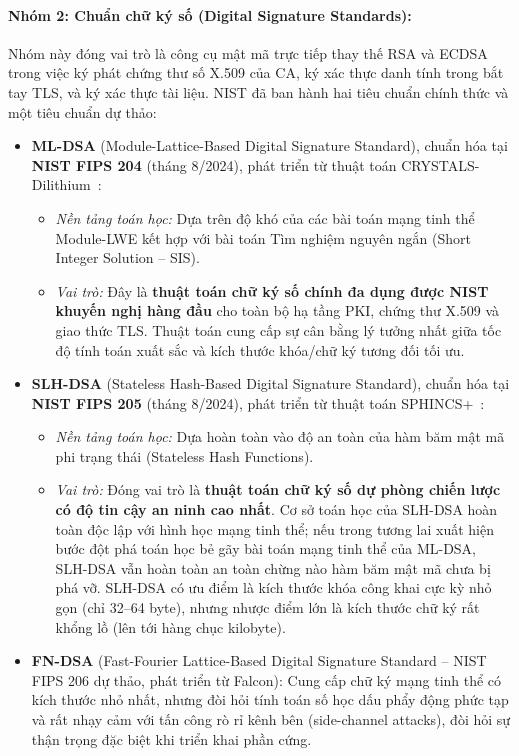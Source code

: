 \paragraph{Nhóm 2: Chuẩn chữ ký số (Digital Signature Standards):}
Nhóm này đóng vai trò là công cụ mật mã trực tiếp thay thế RSA và ECDSA trong việc ký phát chứng thư số X.509 của CA, ký xác thực danh tính trong bắt tay TLS, và ký xác thực tài liệu. NIST đã ban hành hai tiêu chuẩn chính thức và một tiêu chuẩn dự thảo:
\begin{itemize}
    \item \textbf{ML-DSA} (Module-Lattice-Based Digital Signature Standard), chuẩn hóa tại \textbf{NIST FIPS 204} (tháng 8/2024), phát triển từ thuật toán CRYSTALS-Dilithium~\cite{fips204}:
    \begin{itemize}
        \item \textit{Nền tảng toán học:} Dựa trên độ khó của các bài toán mạng tinh thể Module-LWE kết hợp với bài toán Tìm nghiệm nguyên ngắn (Short Integer Solution -- SIS).
        \item \textit{Vai trò:} Đây là \textbf{thuật toán chữ ký số chính đa dụng được NIST khuyến nghị hàng đầu} cho toàn bộ hạ tầng PKI, chứng thư X.509 và giao thức TLS. Thuật toán cung cấp sự cân bằng lý tưởng nhất giữa tốc độ tính toán xuất sắc và kích thước khóa/chữ ký tương đối tối ưu.
    \end{itemize}
    \item \textbf{SLH-DSA} (Stateless Hash-Based Digital Signature Standard), chuẩn hóa tại \textbf{NIST FIPS 205} (tháng 8/2024), phát triển từ thuật toán SPHINCS+~\cite{fips205}:
    \begin{itemize}
        \item \textit{Nền tảng toán học:} Dựa hoàn toàn vào độ an toàn của hàm băm mật mã phi trạng thái (Stateless Hash Functions).
        \item \textit{Vai trò:} Đóng vai trò là \textbf{thuật toán chữ ký số dự phòng chiến lược có độ tin cậy an ninh cao nhất}. Cơ sở toán học của SLH-DSA hoàn toàn độc lập với hình học mạng tinh thể; nếu trong tương lai xuất hiện bước đột phá toán học bẻ gãy bài toán mạng tinh thể của ML-DSA, SLH-DSA vẫn hoàn toàn an toàn chừng nào hàm băm mật mã chưa bị phá vỡ. SLH-DSA có ưu điểm là kích thước khóa công khai cực kỳ nhỏ gọn (chỉ 32--64 byte), nhưng nhược điểm lớn là kích thước chữ ký rất khổng lồ (lên tới hàng chục kilobyte).
    \end{itemize}
    \item \textbf{FN-DSA} (Fast-Fourier Lattice-Based Digital Signature Standard -- NIST FIPS 206 dự thảo, phát triển từ Falcon): Cung cấp chữ ký mạng tinh thể có kích thước nhỏ nhất, nhưng đòi hỏi tính toán số học dấu phẩy động phức tạp và rất nhạy cảm với tấn công rò rỉ kênh bên (side-channel attacks), đòi hỏi sự thận trọng đặc biệt khi triển khai phần cứng.
\end{itemize}

